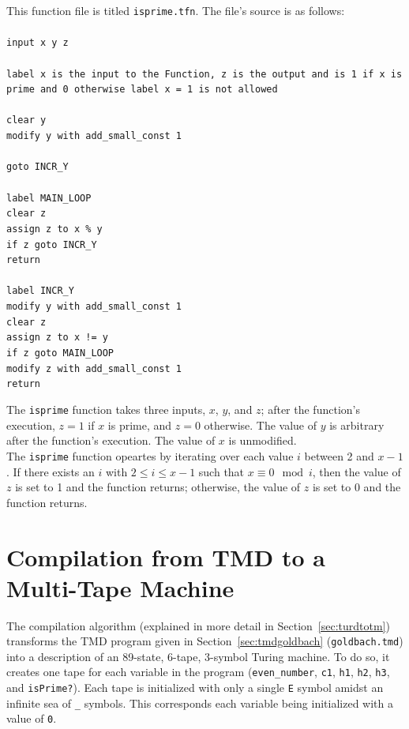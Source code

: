 \documentclass[11pt]{report}
\begin{document}
This function file is titled \texttt{isprime.tfn}. The file's source is as follows: \\ \\
{\tt input x y z \\ \\
label x is the input to the Function, z is the output and is 1 if x is prime and 0 otherwise
label x = 1 is not allowed \\ \\
clear y \\
modify y with add\_small\_const 1 \\ \\ 
goto INCR\_Y \\ \\
label MAIN\_LOOP \\
clear z \\
assign z to x \% y \\
if z goto INCR\_Y \\
return \\ \\
label INCR\_Y \\
modify y with add\_small\_const 1 \\
clear z \\
assign z to x != y \\
if z goto MAIN\_LOOP \\
modify z with add\_small\_const 1 \\
return \\ }

The \texttt{isprime} function takes three inputs, $x$, $y$, and $z$; after the function's execution, $z = 1$ if $x$ is prime, and $z = 0$ otherwise. The value of $y$ is arbitrary after the function's execution. The value of $x$ is unmodified. \\

The \texttt{isprime} function opeartes by iterating over each value $i$ between 2 and $x-1$. If there exists an $i$ with $2 \le i \le x-1$ such that $x \equiv 0 \mod i$, then the value of $z$ is set to 1 and the function returns; otherwise, the value of $z$ is set to 0 and the function returns. \\

\section{Compilation from TMD to a Multi-Tape Machine \label{sec:turdtotmgoldbach}}

The compilation algorithm (explained in more detail in Section~\ref{sec:turdtotm}) transforms the TMD program given in Section~\ref{sec:tmdgoldbach} (\texttt{goldbach.tmd}) into a description of an 89-state, 6-tape, 3-symbol Turing machine. To do so, it creates one tape for each variable in the program (\texttt{even\_number}, \texttt{c1}, \texttt{h1}, \texttt{h2}, \texttt{h3}, and \texttt{isPrime?}). Each tape is initialized with only a single \texttt{E} symbol amidst an infinite sea of \texttt{\_} symbols. This corresponds each variable being initialized with a value of \texttt{0}.
\end{document}

